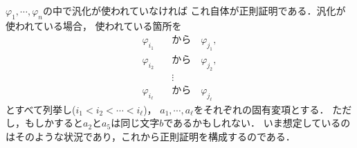 	\begin{metaprf}
		$\varphi_{1},\cdots,\varphi_{n}$の中で汎化が使われていなければ
		これ自体が正則証明である．汎化が使われている場合，
		使われている箇所を
		\begin{align}
			\varphi_{i_{1}} \quad &\mbox{から} \quad \varphi_{j_{1}}, \\
			\varphi_{i_{2}} \quad &\mbox{から} \quad \varphi_{j_{2}}, \\
			&\vdots \\
			\varphi_{i_{\ell}} \quad &\mbox{から} \quad \varphi_{j_{\ell}}
		\end{align}
		とすべて列挙し($i_{1} < i_{2} < \cdots < i_{\ell}$)，
		$a_{1},\cdots,a_{\ell}$をそれぞれの固有変項とする．
		ただし，もしかすると$a_{2}$と$a_{5}$は同じ文字$b$であるかもしれない．
		いま想定しているのはそのような状況であり，これから正則証明を構成するのである．
		

\end{metaprf}
